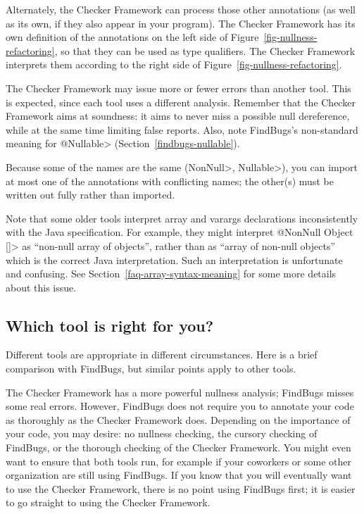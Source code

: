Alternately, the Checker Framework can process those other annotations (as
well as its own, if they also appear in your program).  The Checker
Framework has its own definition of the annotations on the left side of
Figure~\ref{fig-nullness-refactoring}, so that they can be used as type
qualifiers.  The Checker Framework interprets them according to the right
side of Figure~\ref{fig-nullness-refactoring}.

The Checker Framework may issue more or fewer errors than another tool.
This is expected, since each tool uses a different analysis.  Remember that
the Checker Framework aims at soundness:  it aims to never miss a possible
null dereference, while at the same time limiting false reports.  Also,
note FindBugs's non-standard meaning for \<@Nullable>
(Section~\ref{findbugs-nullable}).

Because some of the names are the same (\<NonNull>, \<Nullable>), you can
import at most one of the annotations with
conflicting names; the other(s) must be written out fully rather than
imported.

Note that some older tools interpret array and varargs declarations
inconsistently with the Java specification.  For example, they might
interpret \<@NonNull Object []> as ``non-null array of objects'', rather
than as ``array of non-null objects'' which is the correct Java
interpretation.  Such an interpretation is unfortunate and confusing.  See
Section~\ref{faq-array-syntax-meaning} for some more details about this
issue.


\subsection{Which tool is right for you?\label{choosing-nullness-tool}}

Different tools are appropriate in different circumstances.  Here is a
brief comparison with FindBugs, but similar points apply to other tools.

The Checker Framework has a more powerful nullness analysis; FindBugs misses
some real
errors.  However, FindBugs does not require you to annotate your code as
thoroughly as the Checker Framework does.  Depending on the importance of
your code, you may desire:  no nullness checking, the cursory checking of
FindBugs, or the thorough checking of the Checker Framework.  You might
even want to ensure that both tools run, for example if your coworkers or
some other organization are still using FindBugs.  If you know that you
will eventually want to use the Checker Framework, there is no point using
FindBugs first; it is easier to go straight to using the Checker Framework.

